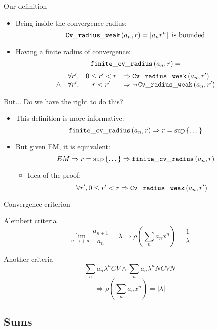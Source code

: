 \documentclass{beamer}
\begin{document}
\begin{frame}{Our definition}
\begin{itemize}
  \item Being inside the convergence radius:
  $$\operatorname{\mathtt{Cv\_radius\_weak}}{}(a_n,r) = \left| a_n r^n \right| \text{ is bounded}$$
  \item<2-> Having a finite radius of convergence:
  $$\operatorname{\mathtt{finite\_cv\_radius}}{}(a_n,r) =$$
  $$\begin{array}{clcl}
    & \forall r', & 0 \le r' < r & \Rightarrow \operatorname{\mathtt{Cv\_radius\_weak}}{}(a_n,r') \\
    \wedge & \forall r', & r < r' & \Rightarrow \neg \operatorname{\mathtt{Cv\_radius\_weak}}{}(a_n,r')
    \end{array}$$
\end{itemize}
\end{frame}

\begin{frame}{But... Do we have the right to do this?}
\begin{itemize}
  \item This definition is more informative:
    $$\operatorname{\mathtt{finite\_cv\_radius}}{}(a_n,r) \Rightarrow r = \sup \left\lbrace \dots \right\rbrace$$
  \item<2-> But given EM, it is equivalent:
    $$EM \Rightarrow r = \sup \left\lbrace \dots \right\rbrace \Rightarrow
    \operatorname{\mathtt{finite\_cv\_radius}}{}(a_n,r) $$
  \begin{itemize}
    \item<3> Idea of the proof:
      $$\forall r', 0 \le r' < r \Rightarrow \operatorname{\mathtt{Cv\_radius\_weak}}{}(a_n,r')$$
  \end{itemize}
\end{itemize}
\end{frame}

\begin{frame}{Convergence criterion}

\begin{alertblock}{Alembert criteria}
$$\lim_{n \rightarrow + \infty}\frac{a_{n+1}}{a_n} = \lambda \Rightarrow
\rho(\sum_n a_n x^n) = \frac{1}{\lambda}$$
\end{alertblock}

\begin{alertblock}{Another criteria}
$$\sum_n a_n \lambda^n CV \wedge \sum_n a_n \lambda^n NCVN$$
$$\Rightarrow \rho(\sum_n a_n x^n) = \left| \lambda \right|$$
\end{alertblock}


\end{frame}

\subsection{Sums}
\end{document}
